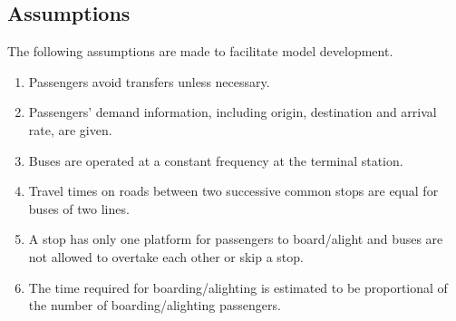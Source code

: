 \documentclass[smallextended]{svjour3}       %
\begin{document}
\begin{Abstract}


\subsection{Assumptions}
The following assumptions are made to facilitate model development.
\begin{enumerate}[{A}1)]
    \item\label{A: avoid transfer} Passengers avoid transfers unless necessary. 
    \item\label{A: OD} Passengers' demand information, including origin, destination and arrival rate, are given.
    \item\label{A: constant supply and demand} Buses are operated at a constant frequency at the terminal station. 
    \item\label{A: T} Travel times on roads between two successive common stops are equal for buses of two lines.
    \item\label{A: FAFD} A stop has only one platform for passengers to board/alight and buses are not allowed to overtake each other or skip a stop. 
    \item\label{A: dwell time} The time required for boarding/alighting is estimated to be proportional of the number of boarding/alighting passengers.
\end{enumerate}


\end{Abstract}
\end{document}
